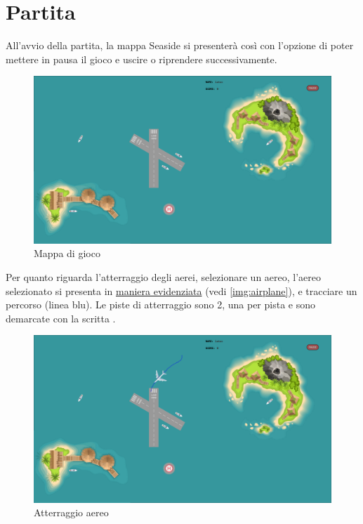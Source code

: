 \documentclass[a4paper,12pt]{report}
\begin{document}
\clearpage

\section*{Partita}
All'avvio della partita, la mappa Seaside si presenterà così con l'opzione di poter mettere in pausa il gioco e uscire o riprendere successivamente.
\begin{figure}[H]
    \begin{center}
        \centering
        \includegraphics[width=\textwidth]{img/GuidaUtente/Seaside.png}
    \end{center}
    \caption{Mappa di gioco}
    \label{img:seaside}
\end{figure}

\clearpage

\noindent Per quanto riguarda l'atterraggio degli aerei, selezionare un aereo, l'aereo selezionato si presenta in \underline{maniera evidenziata} (vedi \figurename{ \ref{img:airplane}}), e tracciare un percorso (linea blu). Le piste di atterraggio sono 2, una per pista e sono demarcate con la scritta .
\begin{figure}[H]
    \begin{center}
        \centering
        \includegraphics[width=\textwidth]{img/GuidaUtente/Landing.png}
    \end{center}
    \caption{Atterraggio aereo}
    \label{img:landing}
\end{figure}
\end{document}
